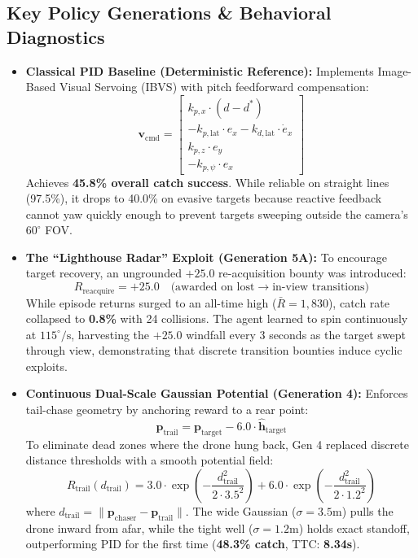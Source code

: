 \documentclass[11pt,a4paper]{article}
\begin{document}
\subsection{Key Policy Generations \& Behavioral Diagnostics}
\begin{itemize}[leftmargin=1.5em, itemsep=0.4em]
    \item \textbf{Classical PID Baseline (Deterministic Reference):} Implements Image-Based Visual Servoing (IBVS) with pitch feedforward compensation:
    \begin{equation}
        \mathbf{v}_{\text{cmd}} = \begin{bmatrix} k_{p, x} \cdot (d - d^*) \\ -k_{p, \text{lat}} \cdot e_x - k_{d, \text{lat}} \cdot \dot{e}_x \\ k_{p, z} \cdot e_y \\ -k_{p, \psi} \cdot e_x \end{bmatrix}
    \end{equation}
    Achieves \textbf{45.8\% overall catch success}. While reliable on straight lines (97.5\%), it drops to 40.0\% on evasive targets because reactive feedback cannot yaw quickly enough to prevent targets sweeping outside the camera's $60^\circ$ FOV.

    \item \textbf{The ``Lighthouse Radar'' Exploit (Generation 5A):} To encourage target recovery, an ungrounded $+25.0$ re-acquisition bounty was introduced:
    \begin{equation}
        R_{\text{reacquire}} = +25.0 \quad \text{(awarded on lost} \to \text{in-view transitions)}
    \end{equation}
    While episode returns surged to an all-time high ($\bar{R} = 1,830$), catch rate collapsed to \textbf{0.8\%} with 24 collisions. The agent learned to spin continuously at $115^\circ/\text{s}$, harvesting the $+25.0$ windfall every 3 seconds as the target swept through view, demonstrating that discrete transition bounties induce cyclic exploits.

    \item \textbf{Continuous Dual-Scale Gaussian Potential (Generation 4):} Enforces tail-chase geometry by anchoring reward to a rear point:
    \begin{equation}
        \mathbf{p}_{\text{trail}} = \mathbf{p}_{\text{target}} - 6.0 \cdot \mathbf{\hat{h}}_{\text{target}}
    \end{equation}
    To eliminate dead zones where the drone hung back, Gen 4 replaced discrete distance thresholds with a smooth potential field:
    \begin{equation}
        R_{\text{trail}}(d_{\text{trail}}) = 3.0 \cdot \exp\left(-\frac{d_{\text{trail}}^2}{2 \cdot 3.5^2}\right) + 6.0 \cdot \exp\left(-\frac{d_{\text{trail}}^2}{2 \cdot 1.2^2}\right)
    \end{equation}
    where $d_{\text{trail}} = \|\mathbf{p}_{\text{chaser}} - \mathbf{p}_{\text{trail}}\|$. The wide Gaussian ($\sigma = 3.5\text{m}$) pulls the drone inward from afar, while the tight well ($\sigma = 1.2\text{m}$) holds exact standoff, outperforming PID for the first time (\textbf{48.3\% catch}, TTC: \textbf{8.34s}).


\end{itemize}
\end{document}
